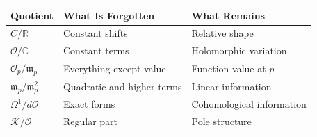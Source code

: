 \documentclass[12pt,a4paper]{article}
\theoremstyle{notespace}
\begin{document}
\begin{center}
	\renewcommand{\arraystretch}{1.4}
	\begin{tabular}{|p{4cm}|p{5cm}|p{5cm}|}
		\hline
		Quotient & What Is Forgotten & What Remains \\
		\hline
		
		\(C/\mathbb R\)
		&
		Constant shifts
		&
		Relative shape
		\\
		\hline
		
		\(\mathcal O/\mathbb C\)
		&
		Constant terms
		&
		Holomorphic variation
		\\
		\hline
		
		\(\mathcal O_p/\mathfrak m_p\)
		&
		Everything except value
		&
		Function value at \(p\)
		\\
		\hline
		
		\(\mathfrak m_p/\mathfrak m_p^2\)
		&
		Quadratic and higher terms
		&
		Linear information
		\\
		\hline
		
		\(\Omega^1/d\mathcal O\)
		&
		Exact forms
		&
		Cohomological information
		\\
		\hline
		
		\(\mathcal K/\mathcal O\)
		&
		Regular part
		&
		Pole structure
		\\
		\hline
		
	\end{tabular}
\end{center}	
	
\end{document}

